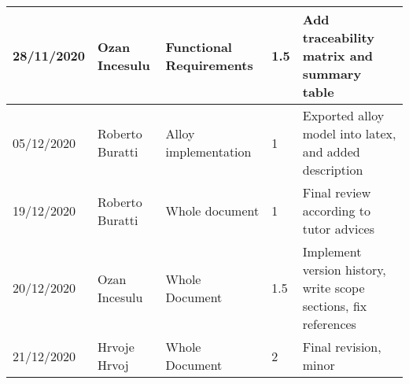\begin{table}[H]
\begin{tabular}{|p{2cm}|p{2.5cm}|p{2cm}|p{1.5cm}|p{8cm}|}
        28/11/2020 & Ozan Incesulu   & Functional Requirements & 1.5           & Add traceability matrix and summary table\\ \hline
        05/12/2020 & Roberto Buratti & Alloy implementation & 1                & Exported alloy model into latex, and added description \\ \hline
        19/12/2020 & Roberto Buratti & Whole document       & 1                & Final review according to tutor advices \\ \hline
        20/12/2020 & Ozan Incesulu   & Whole Document       & 1.5              & Implement version history, write scope sections, fix references \\ \hline
        21/12/2020 & Hrvoje Hrvoj    & Whole Document       & 2                & Final revision, minor \\ \hline
    \end{tabular}
\end{table}
